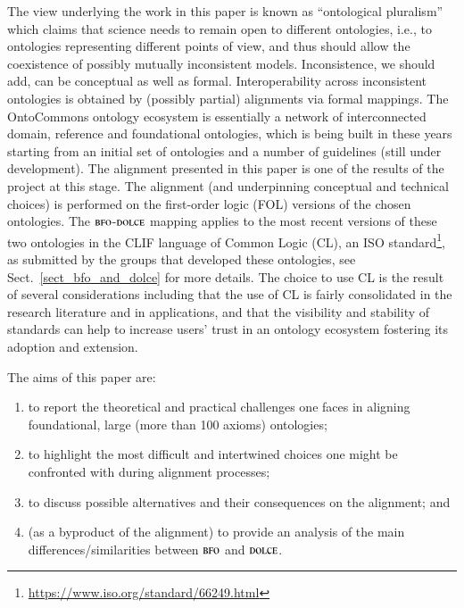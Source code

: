 \documentclass[ao]{iosart2x}
\newcommand{\dolce}{{\textsc{dolce}}}
\newcommand{\bfo}{{\textsc{bfo}}}
\newcommand{\emmo}{{\textsc{emmo}}}
\begin{document}
The view underlying the work in this paper is known as ``ontological pluralism'' which claims that science needs to remain open to different ontologies, i.e., to ontologies representing different points of view, and thus should allow the coexistence of possibly mutually inconsistent models. Inconsistence, we should add, can be conceptual as well as formal. Interoperability across inconsistent ontologies is obtained by (possibly partial) alignments via formal mappings. The OntoCommons ontology ecosystem is essentially a network of interconnected domain, reference and foundational ontologies, which is being built in these years starting from an initial set of ontologies and a number of guidelines (still under development). The alignment presented in this paper is one of the results of the project at this stage. 
The alignment (and underpinning conceptual and technical choices) is performed on the first-order logic (FOL) versions of the chosen ontologies. 
The $\bfo$-$\dolce$ mapping applies to the most recent versions of these two ontologies in the CLIF language of Common Logic (CL), an ISO standard\footnote{\url{https://www.iso.org/standard/66249.html}}, as submitted by the groups that developed these ontologies, see Sect.~\ref{sect_bfo_and_dolce} for more details. 
The choice to use CL is the result of several considerations including that the use of CL is fairly consolidated in the research literature and in applications, and that the visibility and stability of standards can help to increase users' trust in an ontology ecosystem fostering its adoption and extension.

\medskip 
The aims of this paper are:  
\begin{enumerate}[$(i)$]
\item to report the theoretical and practical challenges one faces in aligning foundational, large (more than 100 axioms) ontologies; 
\item to highlight the most difficult and intertwined choices one might be confronted with during alignment processes;
\item to discuss possible alternatives and their consequences on the alignment; and 
\item (as a byproduct of the alignment) to provide an analysis of the main differences/similarities between $\bfo$ and $\dolce$.
\end{enumerate}
\end{document}
